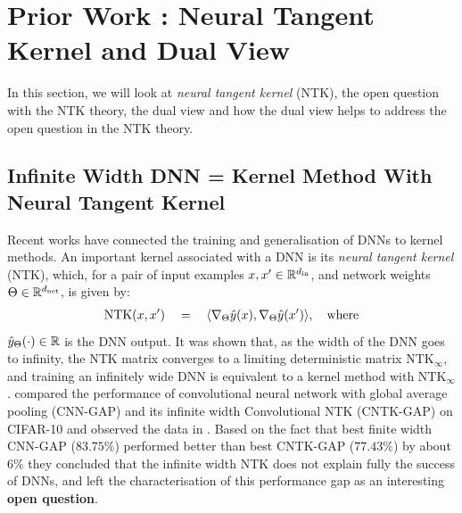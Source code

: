 \section{Prior Work : Neural Tangent Kernel and Dual View}\label{sec:prelim}
In this section, we will look at \emph{neural tangent kernel} (NTK), the open question with the NTK theory\citep{arora2019exact}, the dual view \citep{npk} and how the dual view helps to address the open question in the NTK theory. %

\subsection{Infinite Width DNN  = Kernel Method With Neural Tangent Kernel}\label{sec:ntk}
Recent works \citep{ntk,arora2019exact,cao2019generalization} have connected the training and generalisation of DNNs to kernel methods. An important kernel associated with a DNN is its \emph{neural tangent kernel} (NTK), which, for a pair of input examples $x,x'\in\mathbb{R}^{d_{\text{in}}}$, and network weights $\Theta\in\mathbb{R}^{d_{\text{net}}}$, is given by:
\begin{align*}
 \text{NTK}(x,x')\quad = \quad \langle \nabla_{\Theta}\hat{y}(x), \nabla_{\Theta}\hat{y}(x')\rangle, \quad\text{where}
\end{align*}
$\hat{y}_\Theta(\cdot)\in\mathbb{R}$ is the DNN output. It was shown that, as the width of the DNN goes to infinity, the NTK matrix converges to a limiting deterministic matrix $\text{NTK}_{\infty}$, and training an infinitely wide DNN is equivalent to a kernel method with $\text{NTK}_{\infty}$. \cite{arora2019exact} compared the performance of convolutional neural network with global average pooling (CNN-GAP) and its infinite width Convolutional NTK (CNTK-GAP) on CIFAR-10 and observed the data in .   Based on the fact that best finite width CNN-GAP ($83.75\%$) performed better than best CNTK-GAP ($77.43\%$) by about $6\%$ they concluded that the infinite width NTK does not explain fully the success of DNNs, and left the characterisation of this performance gap as an interesting \textbf{open question}. 

